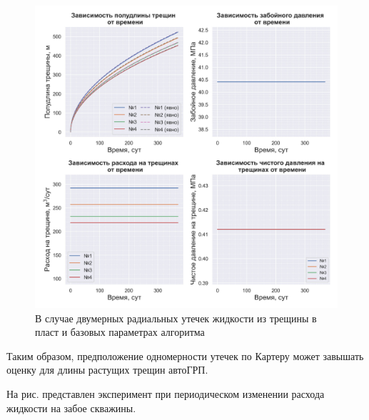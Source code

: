 \begin{figure}[H] 
\center
\includegraphics[width=\linewidth]{images/myimage2.jpg}
\caption{В случае двумерных радиальных утечек жидкости из трещины в пласт и базовых параметрах алгоритма} 
\label{fig:myimage2}
\end{figure}


Таким образом, предположение одномерности утечек по Картеру \cite{karter} может завышать оценку для длины растущих трещин автоГРП.


На рис. представлен эксперимент при периодическом изменении расхода жидкости на забое скважины.

